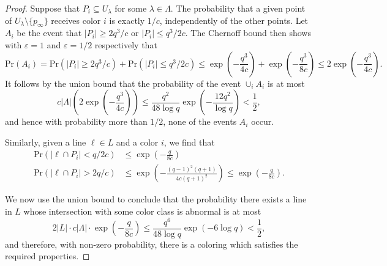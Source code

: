 \documentclass[12pt]{article}
\newcommand{\red}[1]{\textcolor{red}{#1}}
\theoremstyle{definition}
\begin{document}
	\begin{proof}
		Suppose that $P_i \subseteq U_\lambda$ for some $\lambda \in \Lambda$. The probability that a given point of $U_\lambda \setminus \{p_\infty\}$ receives color $i$ is exactly $1/c$, independently of the other points. Let $A_i$ be the event that $|P_i| \geq 2q^3/c$ or $|P_i| \leq q^3/2c$. The Chernoff bound then shows with $\varepsilon = 1$ and $\varepsilon = 1/2$ respectively that
		\[\mathrm{Pr}(A_i) = \mathrm{Pr}(|P_i| \geq 2q^3/c) + \mathrm{Pr}(|P_i| \leq q^3/2c) \leq \exp\left(-\frac{q^3}{4c}\right) + \exp\left(-\frac{q^3}{8c}\right) \leq 2\exp\left(-\frac{q^3}{4c}\right).\]
		It follows by the union bound that the probability of the event $\cup_i A_i$ is at most
		\[c|\Lambda|\left(2\exp\left(-\frac{q^3}{4c}\right)\right) \leq \frac{q^2}{48\log q}\exp\left(-\frac{12q^2}{\log q}\right) < \frac{1}{2}, \]
		and hence with probability more than $1/2$, none of the events $A_i$ occur.
		
		Similarly, given a line $\ell \in L$ and a color $i$, we find that
		\begin{align}
			\mathrm{Pr}(|\ell \cap P_i| < q/2c) &\leq \exp\left(-\frac{q}{8c}\right) \\
			\mathrm{Pr}(|\ell \cap P_i| > 2q/c) &\leq \exp\left(-\frac{(q-1)^2(q+1)}{4c(q+1)^2}  \right) \leq \exp\left(-\frac{q}{8c} \right).
		\end{align}
       

        
		We now use the union bound to conclude that the probability there exists a line in $L$ whose intersection with some color class is abnormal is at most
		\[2|L|\cdot c|\Lambda|\cdot \exp\left(-\frac{q}{8c}\right) \leq \frac{q^6}{48\log q}\exp(-6\log q) < \frac{1}{2},\]
		and therefore, with non-zero probability, there is a coloring which satisfies the required properties.
	\end{proof}
	
\end{document}
